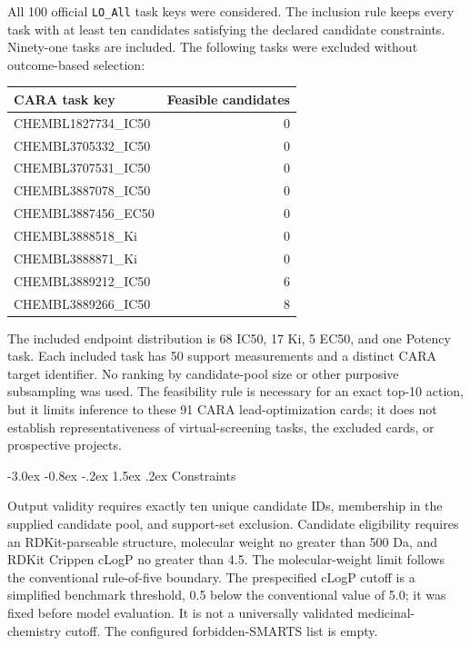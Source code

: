 \documentclass[10pt,a4paper]{article}
\makeatletter
\renewcommand\section{\@startsection{section}{1}{\z@}%
  {-3.0ex \@plus -0.8ex \@minus -.2ex}%
  {1.5ex \@plus .2ex}%
  {\normalfont\Large\bfseries}}
\makeatother
\begin{document}
All 100 official \texttt{LO\_All} task keys were considered. The inclusion rule
keeps every task with at least ten candidates satisfying the declared candidate
constraints. Ninety-one tasks are included. The following tasks were excluded
without outcome-based selection:

\begin{longtable}{@{}lr@{}}
\toprule
\textbf{CARA task key} & \textbf{Feasible candidates} \\
\midrule
\endhead
CHEMBL1827734\_IC50 & 0 \\
CHEMBL3705332\_IC50 & 0 \\
CHEMBL3707531\_IC50 & 0 \\
CHEMBL3887078\_IC50 & 0 \\
CHEMBL3887456\_EC50 & 0 \\
CHEMBL3888518\_Ki & 0 \\
CHEMBL3888871\_Ki & 0 \\
CHEMBL3889212\_IC50 & 6 \\
CHEMBL3889266\_IC50 & 8 \\
\bottomrule
\end{longtable}

The included endpoint distribution is 68 IC50, 17 Ki, 5 EC50, and one Potency
task. Each included task has 50 support measurements and a distinct CARA target
identifier. No ranking by candidate-pool size or other purposive subsampling was
used. The feasibility rule is necessary for an exact top-10 action, but it
limits inference to these 91 CARA lead-optimization cards; it does not establish
representativeness of virtual-screening tasks, the excluded cards, or
prospective projects.

\section{Constraints}

Output validity requires exactly ten unique candidate IDs, membership in the
supplied candidate pool, and support-set exclusion. Candidate eligibility
requires an RDKit-parseable structure, molecular weight no greater than 500 Da,
and RDKit Crippen cLogP no greater than 4.5. The molecular-weight limit follows
the conventional rule-of-five boundary. The prespecified cLogP cutoff is a
simplified benchmark threshold, 0.5 below the conventional value of 5.0; it was
fixed before model evaluation. It is not a universally validated
medicinal-chemistry cutoff. The configured forbidden-SMARTS list is empty.
\end{document}
